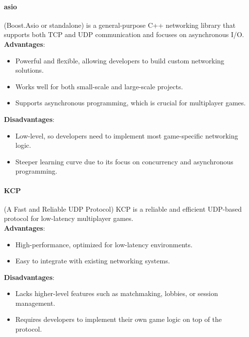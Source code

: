 \documentclass{article} %
\begin{document}
\paragraph{asio} (Boost.Asio or standalone) is a general-purpose C++ networking library that supports both TCP and UDP communication and focuses on asynchronous I/O.
\\
\textbf{Advantages}:
\begin{itemize}
    \item Powerful and flexible, allowing developers to build custom networking solutions.
    \item Works well for both small-scale and large-scale projects.
    \item Supports asynchronous programming, which is crucial for multiplayer games.
\end{itemize}
\textbf{Disadvantages}:
\begin{itemize}
    \item Low-level, so developers need to implement most game-specific networking logic.
    \item Steeper learning curve due to its focus on concurrency and asynchronous programming.
\end{itemize}

\paragraph{KCP} (A Fast and Reliable UDP Protocol) KCP is a reliable and efficient UDP-based protocol for low-latency multiplayer games.
\\
\textbf{Advantages}:
\begin{itemize}
    \item High-performance, optimized for low-latency environments.
    \item Easy to integrate with existing networking systems.
\end{itemize}
\textbf{Disadvantages}:
\begin{itemize}
    \item Lacks higher-level features such as matchmaking, lobbies, or session management.
    \item Requires developers to implement their own game logic on top of the protocol.
\end{itemize}
\end{document}
